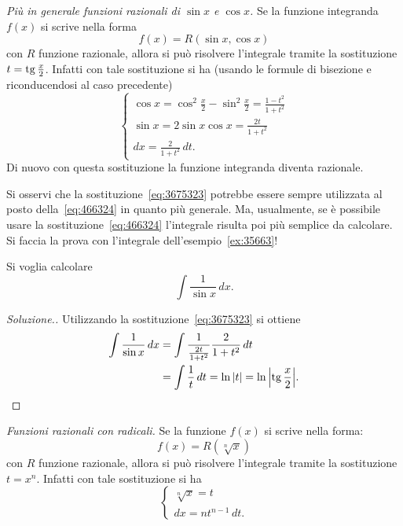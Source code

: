 \emph{Più in generale funzioni razionali di $\sin x$ e $\cos x$.}
Se la funzione integranda $f(x)$ si scrive nella forma
\[
  f(x) = R(\sin x, \cos x)
\]
con $R$ funzione razionale, allora si può risolvere l'integrale
tramite la sostituzione $t=\operatorname{tg} \frac{x}{2}$. Infatti con tale sostituzione si ha
(usando le formule di bisezione e riconducendosi al caso precedente)
\begin{equation}\label{eq:3675323}
  \begin{cases}
    \cos x = \cos^2 \frac x 2 - \sin^2 \frac x 2 = \frac{1-t^2}{1+t^2} \\
    \sin x = 2 \sin x \cos x = \frac{2t}{1+t^2}\\
    dx = \frac{2}{1+t^2}\, dt.
  \end{cases}
\end{equation}
Di nuovo con questa sostituzione la funzione integranda diventa razionale.

\begin{remark}
Si osservi che la sostituzione~\eqref{eq:3675323} potrebbe essere
sempre utilizzata al posto della~\eqref{eq:466324} in quanto più generale.
Ma, usualmente, se è possibile usare la sostituzione~\eqref{eq:466324}
l'integrale risulta
poi più semplice da calcolare. Si faccia la prova con l'integrale
dell'esempio~\ref{ex:35663}!
\end{remark}

\begin{example}
Si voglia calcolare
\[
 \int \frac{1}{\sin x}\, dx.
\]
\end{example}
\begin{proof}[Soluzione.]
Utilizzando la sostituzione~\eqref{eq:3675323}
si ottiene
\begin{align*}
  \int \frac{1}{\sin x}\, dx
  &= \int \frac{1}{\frac{2t}{1+t^2}}\frac{2}{1+t^2}\, dt \\
  &= \int \frac{1}{t}\, dt = \ln{\left|t\right|} = \ln {\left|\operatorname{tg}\frac x 2\right|}.
\end{align*}
\end{proof}

\emph{Funzioni razionali con radicali.}
Se la funzione $f(x)$ si scrive nella forma:
\[
  f(x) = R(\sqrt[n] x)
\]
con $R$ funzione razionale, allora si può risolvere l'integrale tramite
la sostituzione $t = x^n$. Infatti con tale sostituzione si ha
\begin{equation}\label{eq:4675821}
\begin{cases}
  \sqrt[n] x = t\\
  dx = n t^{n-1}\, dt.
\end{cases}
\end{equation}

